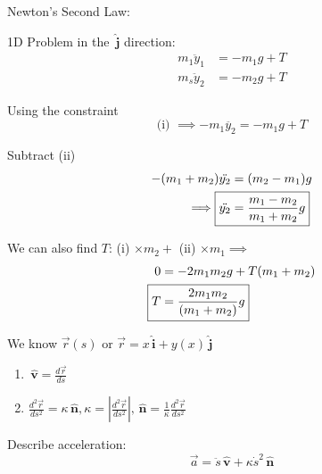 \documentclass[twoside]{scrartcl}
\let\oldhat\hat
\renewcommand{\hat}[1]{\,\oldhat{\boldsymbol{\mathbf{#1}}}}
\begin{document}
\begin{example}[Strings]
Newton's Second Law: 

1D Problem in the $\hat{j}$ direction:
\begin{align*}
  m_1\ddot y_1 &= -m_1g + T \tag{i}\\
  m_s\ddot y_2 &= -m_2g + T \tag{ii}
\end{align*}

Using the constraint 
\[\text{(i) } \implies -m_1 \ddot{y_2} = -m_1g + T\]

Subtract (ii)
\[
\begin{aligned}
  -(m_1 + m_2)\ddot{y_2} &= (m_2 - m_1)g\\
  \implies \Aboxed{\ddot{y_2} &= \frac{m_1 - m_2}{m_1 + m_2}g}
\end{aligned}
\]

We can also find $T$: (i) $\times m_2 + $ (ii) $ \times m_1 \implies$
\[
\begin{aligned}
  0 &= -2m_1m_2g + T(m_1+m_2)\\
  \Aboxed{T &= \frac{2m_1m_2}{(m_1+m_2)}g}
\end{aligned}
\]
\end{example}





We know  $\vec{r}(s)$ or $\vec{r} = x\hat{i} + y(x)\hat{j}$
\begin{enumerate}
  \item $\hat{v} = \frac{d\vec{r}}{ds}$
  \item $\frac{d^2\vec{r}}{ds^2} = \kappa\hat{n}, \kappa = \left|\frac{d^2\vec{r}}{ds^2}\right|, \hat{n} = \frac{1}{\kappa}\frac{d^2\vec{r}}{ds^2}$
\end{enumerate}

Describe acceleration:
\[
  \vec{a} = \ddot{s}\hat{v} + \kappa \dot{s}^2\hat{n}
\]

\begin{center}
\end{center}
\end{document}
